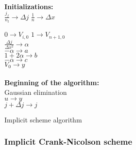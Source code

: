 \documentclass[a4paper, twoside, 11pt]{report}
\theoremstyle{theorem}
\theoremstyle{remark}
\theoremstyle{exemple}
\begin{document}
                    \begin{center}
                    \begin{algorithm}[H]

                    \SetAlgoLined

                         \\
                         \\
                          \\

                        \textbf{Initializations:}  \\
                            $\displaystyle \frac{j_f}{n_t} \rightarrow \Delta j$
                            $\displaystyle \frac{1}{n} \rightarrow \Delta x$

                            {
                                $0 \rightarrow V_{i,0}$
                            }
                            $1 \rightarrow V_{n+1,0}$  \\

                            $\displaystyle \frac{\Delta j}{\Delta x^2} \rightarrow \alpha$\\
                            $-\alpha \rightarrow a$\\
                            $1+2\alpha \rightarrow b$\\
                            $-\alpha \rightarrow c$\\
                            $V_0 \rightarrow y$\\
                            \ \\
                        \textbf{Beginning of the algorithm:} \\
                        {
                             Gaussian elimination\\
                             $u \rightarrow y$ \\
                             $j+\Delta j \rightarrow j$
                        }
                    \caption{Implicit scheme algorithm}
                    \end{algorithm}
                    \end{center}


            \subsubsection{Implicit Crank-Nicolson scheme}
\end{document}
